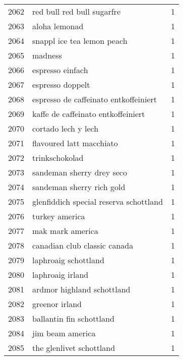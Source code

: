 \begin{tabular}{llr}
2062 &                         red bull red bull sugarfre &      1 \\
2063 &                                      aloha lemonad &      1 \\
2064 &                         snappl ice tea lemon peach &      1 \\
2065 &                                            madness &      1 \\
2066 &                                   espresso einfach &      1 \\
2067 &                                   espresso doppelt &      1 \\
2068 &              espresso de caffeinato entkoffeiniert &      1 \\
2069 &                 kaffe de caffeinato entkoffeiniert &      1 \\
2070 &                                cortado lech y lech &      1 \\
2071 &                           flavoured latt macchiato &      1 \\
2072 &                                     trinkschokolad &      1 \\
2073 &                          sandeman sherry drey seco &      1 \\
2074 &                          sandeman sherry rich gold &      1 \\
2075 &             glenfiddich special reserva schottland &      1 \\
2076 &                                     turkey america &      1 \\
2077 &                                   mak mark america &      1 \\
2078 &                       canadian club classic canada &      1 \\
2079 &                               laphroaig schottland &      1 \\
2080 &                                   laphroaig irland &      1 \\
2081 &                         ardmor highland schottland &      1 \\
2082 &                                     greenor irland &      1 \\
2083 &                           ballantin fin schottland &      1 \\
2084 &                                   jim beam america &      1 \\
2085 &                           the glenlivet schottland &      1 \\

\end{tabular}
